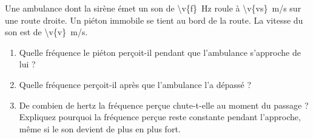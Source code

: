 Une ambulance dont la sirène émet un son de \qty{\v{f}}{Hz} roule à \qty{\v{vs}}{m/s} sur une route droite. Un piéton immobile se tient au bord de la route. La vitesse du son est de \qty{\v{v}}{m/s}.

\begin{enumerate}[label=\alph*)]
    \item Quelle fréquence le piéton perçoit-il pendant que l'ambulance s'approche de lui ?
    \item Quelle fréquence perçoit-il après que l'ambulance l'a dépassé ?
    \item De combien de hertz la fréquence perçue chute-t-elle au moment du passage ? Expliquez pourquoi la fréquence perçue reste constante pendant l'approche, même si le son devient de plus en plus fort.
\end{enumerate}
